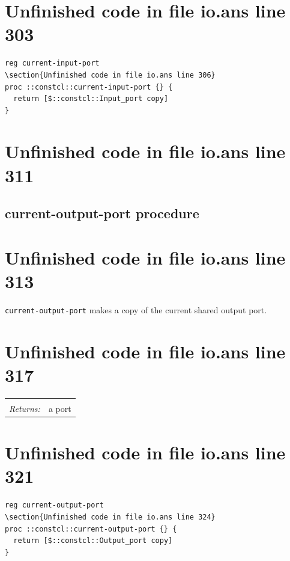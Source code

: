 \documentclass[twoside,9pt]{report}
\begin{document}
\section{Unfinished code in file io.ans line 303}
\begin{lstlisting}
reg current-input-port
\section{Unfinished code in file io.ans line 306}
proc ::constcl::current-input-port {} {
  return [$::constcl::Input_port copy]
}
\end{lstlisting}
\section{Unfinished code in file io.ans line 311}
\subsection{current-output-port procedure}
\label{current-output-port-procedure}
\section{Unfinished code in file io.ans line 313}


\texttt{current-output-port} makes a copy of the current shared output port.

\section{Unfinished code in file io.ans line 317}
\noindent\begin{tabular}{ |p{1.9cm} p{8cm}| }
\hline
\rowcolor[HTML]{CCCCCC} \multicolumn{2}{|l|}{\bf current-output-port (public)} \\
\textit{Returns:} & a port \\
\hline
\end{tabular}
\section{Unfinished code in file io.ans line 321}
\begin{lstlisting}
reg current-output-port
\section{Unfinished code in file io.ans line 324}
proc ::constcl::current-output-port {} {
  return [$::constcl::Output_port copy]
}
\end{lstlisting}
\end{document}
